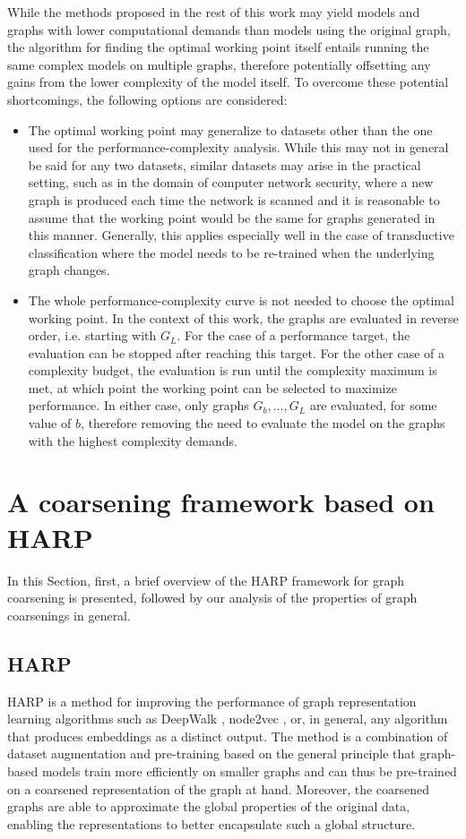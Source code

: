 \documentclass[sn-mathphys,pdflatex,iicol]{sn-jnl}%
\begin{document}
While the methods proposed in the rest of this work may yield models and graphs with lower computational demands than models using the original graph, the algorithm for finding the optimal working point itself entails running the same complex models on multiple graphs, therefore potentially offsetting any gains from the lower complexity of the model itself. To overcome these potential shortcomings, the following options are considered:
\begin{itemize}
  \item The optimal working point may generalize to datasets other than the one used for the performance-complexity analysis. While this may not in general be said for any two datasets, similar datasets may arise in the practical setting, such as in the domain of computer network security, where a new graph is produced each time the network is scanned and it is reasonable to assume that the working point would be the same for graphs generated in this manner. Generally, this applies especially well in the case of transductive classification where the model needs to be re-trained when the underlying graph changes.
  \item The whole performance-complexity curve is not needed to choose the optimal working point. In the context of this work, the graphs are evaluated in reverse order, i.e. starting with \( G_L \). For the case of a performance target, the evaluation can be stopped after reaching this target. For the other case of a complexity budget, the evaluation is run until the complexity maximum is met, at which point the working point can be selected to maximize performance. In either case, only graphs \( G_b, \dots, G_L \) are evaluated, for some value of \( b \), therefore removing the need to evaluate the model on the graphs with the highest complexity demands.
\end{itemize}

\section{A coarsening framework based on HARP}\label{sec:harp-framework}

In this Section, first, a brief overview of the HARP framework for graph coarsening \cite{chen_harp_2018} is presented, followed by our analysis of the properties of graph coarsenings in general.

\subsection{HARP}\label{sec:harp}
HARP is a method for improving the performance of graph representation learning algorithms such as DeepWalk \cite{perozzi_deepwalk_2014}, node2vec \cite{grover_node2vec_2016}, or, in general, any algorithm that produces embeddings as a distinct output. The method is a combination of dataset augmentation and pre-training based on the general principle that graph-based models train more efficiently on smaller graphs and can thus be pre-trained on a coarsened representation of the graph at hand. Moreover, the coarsened graphs are able to approximate the global properties of the original data, enabling the representations to better encapsulate such a global structure.
\end{document}
